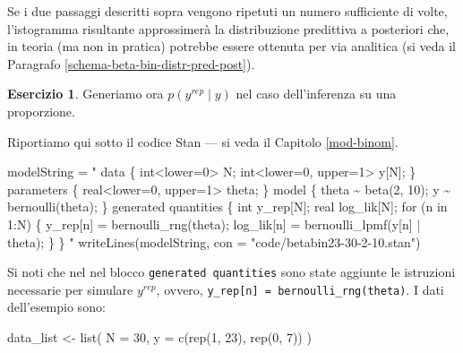 \documentclass[
  11pt,
]{krantz}
\makeatletter
\newenvironment{Shaded}{\begin{snugshade}}{\end{snugshade}}
\newcommand{\AttributeTok}[1]{\textcolor[rgb]{0.61,0.61,0.61}{#1}}
\newcommand{\DecValTok}[1]{\textcolor[rgb]{0.06,0.06,0.06}{#1}}
\newcommand{\FunctionTok}[1]{\textcolor[rgb]{0,0,0}{#1}}
\newcommand{\NormalTok}[1]{#1}
\newcommand{\OtherTok}[1]{\textcolor[rgb]{0.37,0.37,0.37}{#1}}
\newcommand{\StringTok}[1]{\textcolor[rgb]{0.5,0.5,0.5}{#1}}
\newenvironment{kframe}{%
\medskip{}
\setlength{\fboxsep}{.8em}
 \def\at@end@of@kframe{}%
 \ifinner\ifhmode%
  \def\at@end@of@kframe{\end{minipage}}%
  \begin{minipage}{\columnwidth}%
 \fi\fi%
 \def\FrameCommand##1{\hskip\@totalleftmargin \hskip-\fboxsep
 \colorbox{shadecolor}{##1}\hskip-\fboxsep
     \hskip-\linewidth \hskip-\@totalleftmargin \hskip\columnwidth}%
 \MakeFramed {\advance\hsize-\width
   \@totalleftmargin\z@ \linewidth\hsize
   \@setminipage}}%
 {\par\unskip\endMakeFramed%
 \at@end@of@kframe}
\renewenvironment{Shaded}{\begin{kframe}}{\end{kframe}}
\theoremstyle{definition}
\theoremstyle{definition}
\theoremstyle{definition}
\newtheorem{exercise}{Esercizio}[chapter]
\theoremstyle{definition}
\theoremstyle{remark}
\makeatother
\begin{document}
\noindent Se i due passaggi descritti sopra vengono ripetuti un numero sufficiente di volte, l'istogramma risultante approssimerà la distribuzione predittiva a posteriori che, in teoria (ma non in pratica) potrebbe essere ottenuta per via analitica (si veda il Paragrafo \ref{schema-beta-bin-distr-pred-post}).

\begin{exercise}

Generiamo ora \(p(y^{rep} \mid y)\) nel caso dell'inferenza su una proporzione.

Riportiamo qui sotto il codice Stan --- si veda il Capitolo \ref{mod-binom}.

\begin{Shaded}
\begin{Highlighting}[]
\NormalTok{modelString }\OtherTok{=} \StringTok{"}
\StringTok{data \{}
\StringTok{  int\textless{}lower=0\textgreater{} N;}
\StringTok{  int\textless{}lower=0, upper=1\textgreater{} y[N];}
\StringTok{\}}
\StringTok{parameters \{}
\StringTok{  real\textless{}lower=0, upper=1\textgreater{} theta;}
\StringTok{\}}
\StringTok{model \{}
\StringTok{  theta \textasciitilde{} beta(2, 10);}
\StringTok{  y \textasciitilde{} bernoulli(theta);}
\StringTok{\}}
\StringTok{generated quantities \{}
\StringTok{  int y\_rep[N];}
\StringTok{  real log\_lik[N];}
\StringTok{  for (n in 1:N) \{}
\StringTok{    y\_rep[n] = bernoulli\_rng(theta);}
\StringTok{    log\_lik[n] = bernoulli\_lpmf(y[n] | theta);}
\StringTok{  \}}
\StringTok{\}}
\StringTok{"}
\FunctionTok{writeLines}\NormalTok{(modelString, }\AttributeTok{con =} \StringTok{"code/betabin23{-}30{-}2{-}10.stan"}\NormalTok{)}
\end{Highlighting}
\end{Shaded}

\noindent Si noti che nel nel blocco \texttt{generated\ quantities} sono state aggiunte le istruzioni necessarie per simulare \(y^{rep}\), ovvero, \texttt{y\_rep{[}n{]}\ =\ bernoulli\_rng(theta)}. I dati dell'esempio sono:

\begin{Shaded}
\begin{Highlighting}[]
\NormalTok{data\_list }\OtherTok{\textless{}{-}} \FunctionTok{list}\NormalTok{(}
  \AttributeTok{N =} \DecValTok{30}\NormalTok{,}
  \AttributeTok{y =} \FunctionTok{c}\NormalTok{(}\FunctionTok{rep}\NormalTok{(}\DecValTok{1}\NormalTok{, }\DecValTok{23}\NormalTok{), }\FunctionTok{rep}\NormalTok{(}\DecValTok{0}\NormalTok{, }\DecValTok{7}\NormalTok{))}
\NormalTok{)}
\end{Highlighting}
\end{Shaded}


\end{exercise}
\end{document}
